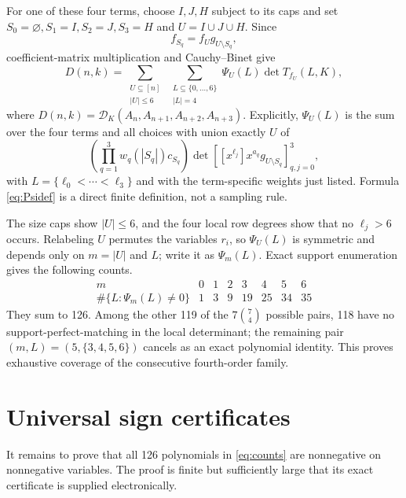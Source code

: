 \documentclass[11pt]{article}
\newcommand{\coeff}[2]{[x^{#1}]#2}
\newcommand{\cD}{\mathcal{D}}
\begin{document}
For one of these four terms, choose $I,J,H$ subject to its caps and set
$S_0=\varnothing,S_1=I,S_2=J,S_3=H$ and
$U=I\cup J\cup H$.  Since
\[
 f_{S_q}=f_U g_{U\setminus S_q},
\]
coefficient-matrix multiplication and Cauchy--Binet give
\begin{equation}\label{eq:master}
 D(n,k)=
 \sum_{\substack{U\subseteq[n]\\ |U|\leq6}}
 \ \sum_{\substack{L\subseteq\{0,\ldots,6\}\\|L|=4}}
 \Psi_U(L)\det T_{f_U}(L,K),
\end{equation}
where $D(n,k)=\cD_K(A_n,A_{n+1},A_{n+2},A_{n+3})$.  Explicitly,
$\Psi_U(L)$ is the sum over the four terms and all choices with union exactly
$U$ of
\begin{equation}\label{eq:Psidef}
 \left(\prod_{q=1}^3 w_q(|S_q|)c_{S_q}\right)
 \det\!\left[\coeff{\ell_j}{x^{a_q}g_{U\setminus S_q}}\right]_{q,j=0}^3,
\end{equation}
with $L=\{\ell_0<\cdots<\ell_3\}$ and with the term-specific weights just
listed.  Formula \eqref{eq:Psidef} is a direct finite definition, not a
sampling rule.

The size caps show $|U|\leq6$, and the four local row degrees show that no
$\ell_j>6$ occurs.  Relabeling $U$ permutes the variables $r_i$, so
$\Psi_U(L)$ is symmetric and depends only on $m=|U|$ and $L$; write it as
$\Psi_m(L)$.  Exact support enumeration gives the following counts.
\begin{equation}\label{eq:counts}
\begin{array}{c|rrrrrrr}
m&0&1&2&3&4&5&6\\ \hline
\#\{L:\Psi_m(L)\ne0\}&1&3&9&19&25&34&35
\end{array}
\end{equation}
They sum to 126.  Among the other 119 of the $7\binom74$ possible pairs,
118 have no support-perfect-matching in the local determinant; the remaining
pair $(m,L)=(5,\{3,4,5,6\})$ cancels as an exact polynomial identity.  This
proves exhaustive coverage of the consecutive fourth-order family.

\section{Universal sign certificates}

It remains to prove that all 126 polynomials in \eqref{eq:counts} are
nonnegative on nonnegative variables.  The proof is finite but sufficiently
large that its exact certificate is supplied electronically.
\end{document}
